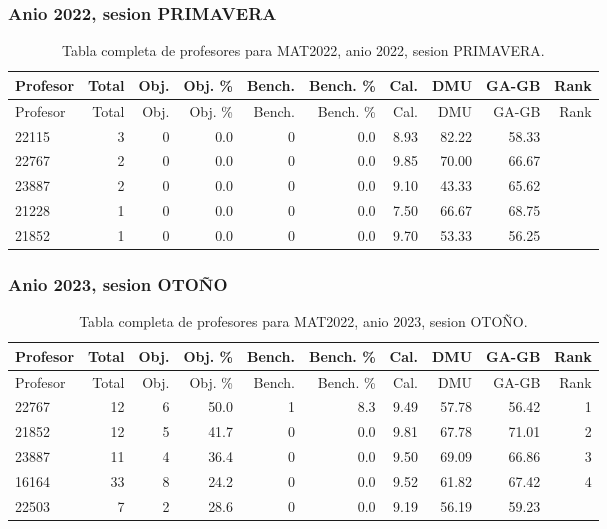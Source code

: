 \subsubsection{Anio 2022, sesion PRIMAVERA}

\begingroup
\scriptsize
\setlength{\tabcolsep}{3pt}
\begin{longtable}{lrrrrrrrrr}
\caption{Tabla completa de profesores para MAT2022, anio 2022, sesion PRIMAVERA.}\label{tab:prof-period-mat2022-2022-primavera}\\
\toprule
Profesor & Total & Obj. & Obj. \% & Bench. & Bench. \% & Cal. & DMU & GA-GB & Rank \\
\midrule
\endfirsthead
\toprule
Profesor & Total & Obj. & Obj. \% & Bench. & Bench. \% & Cal. & DMU & GA-GB & Rank \\
\midrule
\endhead
22115 & 3 & 0 & 0.0 & 0 & 0.0 & 8.93 & 82.22 & 58.33 &  \\
22767 & 2 & 0 & 0.0 & 0 & 0.0 & 9.85 & 70.00 & 66.67 &  \\
23887 & 2 & 0 & 0.0 & 0 & 0.0 & 9.10 & 43.33 & 65.62 &  \\
21228 & 1 & 0 & 0.0 & 0 & 0.0 & 7.50 & 66.67 & 68.75 &  \\
21852 & 1 & 0 & 0.0 & 0 & 0.0 & 9.70 & 53.33 & 56.25 &  \\
\bottomrule
\end{longtable}
\endgroup

\subsubsection{Anio 2023, sesion OTOÑO}

\begingroup
\scriptsize
\setlength{\tabcolsep}{3pt}
\begin{longtable}{lrrrrrrrrr}
\caption{Tabla completa de profesores para MAT2022, anio 2023, sesion OTOÑO.}\label{tab:prof-period-mat2022-2023-oto-o}\\
\toprule
Profesor & Total & Obj. & Obj. \% & Bench. & Bench. \% & Cal. & DMU & GA-GB & Rank \\
\midrule
\endfirsthead
\toprule
Profesor & Total & Obj. & Obj. \% & Bench. & Bench. \% & Cal. & DMU & GA-GB & Rank \\
\midrule
\endhead
22767 & 12 & 6 & 50.0 & 1 & 8.3 & 9.49 & 57.78 & 56.42 & 1 \\
21852 & 12 & 5 & 41.7 & 0 & 0.0 & 9.81 & 67.78 & 71.01 & 2 \\
23887 & 11 & 4 & 36.4 & 0 & 0.0 & 9.50 & 69.09 & 66.86 & 3 \\
16164 & 33 & 8 & 24.2 & 0 & 0.0 & 9.52 & 61.82 & 67.42 & 4 \\
22503 & 7 & 2 & 28.6 & 0 & 0.0 & 9.19 & 56.19 & 59.23 &  \\
\bottomrule
\end{longtable}
\endgroup

